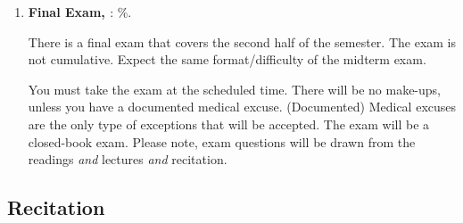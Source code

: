 \documentclass[letterpaper]{article}
\begin{document}
\begin{enumerate}
	\item {\bf Final Exam, \underline{{\unskip}}}: {\unskip}\%. 

There is a final exam that covers the second half of the semester. The exam is not cumulative. Expect the same format/difficulty of the midterm exam.

You must take the exam at the scheduled time. There will be no make-ups, unless you have a documented medical excuse. (Documented) Medical excuses are the only type of exceptions that will be accepted. The exam will be a closed-book exam. Please note, exam questions will be drawn from the readings \emph{and} lectures \emph{and} recitation.


\end{enumerate}



\subsection*{Recitation}
\end{document}

